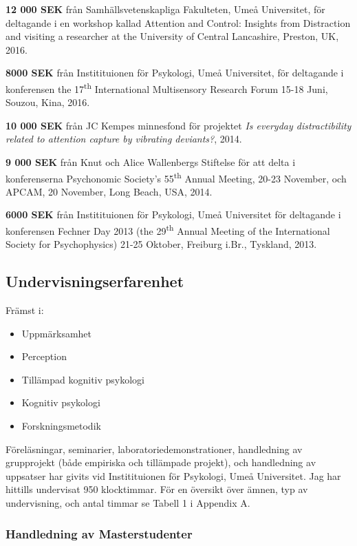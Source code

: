 \documentclass[]{article}
\providecommand{\tightlist}{%
  \setlength{\itemsep}{0pt}\setlength{\parskip}{0pt}}
\begin{document}
\textbf{12 000 SEK} från Samhällsvetenskapliga Fakulteten, Umeå
Universitet, för deltagande i en workshop kallad Attention and Control:
Insights from Distraction and visiting a researcher at the University of
Central Lancashire, Preston, UK, 2016.

\textbf{8000 SEK} från Institituionen för Psykologi, Umeå Universitet,
för deltagande i konferensen the 17\textsuperscript{th} International
Multisensory Research Forum 15-18 Juni, Souzou, Kina, 2016.

\textbf{10 000 SEK} från JC Kempes minnesfond för projektet \emph{Is
everyday distractibility related to attention capture by vibrating
deviants?}, 2014.

\textbf{9 000 SEK} från Knut och Alice Wallenbergs Stiftelse för att
delta i konferenserna Psychonomic Society's 55\textsuperscript{th}
Annual Meeting, 20-23 November, och APCAM, 20 November, Long Beach, USA,
2014.

\textbf{6000 SEK} från Institituionen för Psykologi, Umeå Universitet
för deltagande i konferensen Fechner Day 2013 (the
29\textsuperscript{th} Annual Meeting of the International Society for
Psychophysics) 21-25 Oktober, Freiburg i.Br., Tyskland, 2013.

\subsection{Undervisningserfarenhet}\label{undervisningserfarenhet}

Främst i:

\begin{itemize}
\tightlist
\item
  Uppmärksamhet
\item
  Perception
\item
  Tillämpad kognitiv psykologi
\item
  Kognitiv psykologi
\item
  Forskningsmetodik
\end{itemize}

Föreläsningar, seminarier, laboratoriedemonstrationer, handledning av
grupprojekt (både empiriska och tillämpade projekt), och handledning av
uppsatser har givits vid Institituionen för Psykologi, Umeå Universitet.
Jag har hittills undervisat 950 klocktimmar. För en översikt över ämnen,
typ av undervisning, och antal timmar se Tabell 1 i Appendix A.

\subsubsection{Handledning av
Masterstudenter}\label{handledning-av-masterstudenter}
\end{document}
